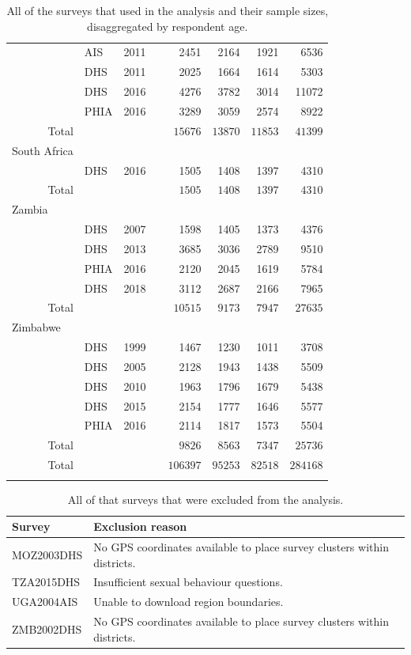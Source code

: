 \documentclass[a4paper, nobind]{templates/ociamthesis}
\newcommand{\cmark}{\ding{51}}
\newcommand{\xmark}{\ding{55}}
\begin{document}
\begin{longtable}{rlrcrrrr}
 & AIS & 2011 & \xmark & 2451 & 2164 & 1921 & 6536 \\ 
 & DHS & 2011 & \xmark & 2025 & 1664 & 1614 & 5303 \\ 
 & DHS & 2016 & \cmark & 4276 & 3782 & 3014 & 11072 \\ 
 & PHIA & 2016 & \xmark & 3289 & 3059 & 2574 & 8922 \\ 
\midrule 
Total &  &  &  & $15676$ & $13870$ & $11853$ & $41399$ \\ 
\midrule
\multicolumn{1}{l}{South Africa} \\ 
\midrule
 & DHS & 2016 & \cmark & 1505 & 1408 & 1397 & 4310 \\ 
Total &  &  &  & $1505$ & $1408$ & $1397$ & $4310$ \\ 
\midrule
\multicolumn{1}{l}{Zambia} \\ 
\midrule
 & DHS & 2007 & \xmark & 1598 & 1405 & 1373 & 4376 \\ 
 & DHS & 2013 & \xmark & 3685 & 3036 & 2789 & 9510 \\ 
 & PHIA & 2016 & \cmark & 2120 & 2045 & 1619 & 5784 \\ 
 & DHS & 2018 & \cmark & 3112 & 2687 & 2166 & 7965 \\ 
Total &  &  &  & $10515$ & $9173$ & $7947$ & $27635$ \\ 
\midrule
\multicolumn{1}{l}{Zimbabwe} \\ 
\midrule
 & DHS & 1999 & \xmark & 1467 & 1230 & 1011 & 3708 \\ 
 & DHS & 2005 & \xmark & 2128 & 1943 & 1438 & 5509 \\ 
 & DHS & 2010 & \xmark & 1963 & 1796 & 1679 & 5438 \\ 
 & DHS & 2015 & \cmark & 2154 & 1777 & 1646 & 5577 \\ 
 & PHIA & 2016 & \cmark & 2114 & 1817 & 1573 & 5504 \\ 
Total &  &  &  & $9826$ & $8563$ & $7347$ & $25736$ \\ 
\midrule 
\midrule 
Total &  &  &  & $106397$ & $95253$ & $82518$ & $284168$ \\ 
\bottomrule
\caption{All of the surveys that used in the analysis and their sample sizes, disaggregated by respondent age.}
\label{tab:surveys-used}
\end{longtable}

\begin{table}[h]
\centering
\begin{tabularx}{\textwidth}{lX}
\toprule
Survey & Exclusion reason \\ 
 \midrule
MOZ2003DHS & No GPS coordinates available to place survey clusters within districts. \\
TZA2015DHS & Insufficient sexual behaviour questions. \\
UGA2004AIS & Unable to download region boundaries. \\
ZMB2002DHS & No GPS coordinates available to place survey clusters within districts. \\
\bottomrule
\end{tabularx}
\label{tab:surveys-excluded}
\caption{All of that surveys that were excluded from the analysis.}
\end{table}
\end{document}
